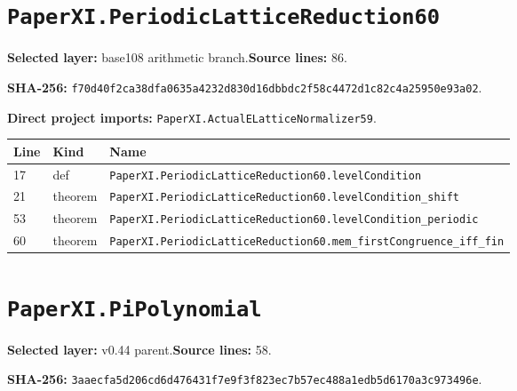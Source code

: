 \documentclass[10pt,oneside]{book}
\begin{document}
\section{\texorpdfstring{\nolinkurl{PaperXI.PeriodicLatticeReduction60}}{PaperXI.PeriodicLatticeReduction60}}\label{module:PaperXI.PeriodicLatticeReduction60}

\textbf{Selected layer:} base108 arithmetic branch.\quad\textbf{Source lines:} 86.\par\textbf{SHA-256:} {\scriptsize\nolinkurl{f70d40f2ca38dfa0635a4232d830d16dbbdc2f58c4472d1c82c4a25950e93a02}}.


\textbf{Direct project imports:} \nolinkurl{PaperXI.ActualELatticeNormalizer59}.

\begin{longtable}{@{}p{}p{}p{}@{}}\toprule Line&Kind&Name\\\midrule\endhead

17&def&\nolinkurl{PaperXI.PeriodicLatticeReduction60.levelCondition}\\

21&theorem&\nolinkurl{PaperXI.PeriodicLatticeReduction60.levelCondition_shift}\\

53&theorem&\nolinkurl{PaperXI.PeriodicLatticeReduction60.levelCondition_periodic}\\

60&theorem&\nolinkurl{PaperXI.PeriodicLatticeReduction60.mem_firstCongruence_iff_fin}\\

\bottomrule\end{longtable}

\section{\texorpdfstring{\nolinkurl{PaperXI.PiPolynomial}}{PaperXI.PiPolynomial}}\label{module:PaperXI.PiPolynomial}

\textbf{Selected layer:} v0.44 parent.\quad\textbf{Source lines:} 58.\par\textbf{SHA-256:} {\scriptsize\nolinkurl{3aaecfa5d206cd6d476431f7e9f3f823ec7b57ec488a1edb5d6170a3c973496e}}.

\end{document}
